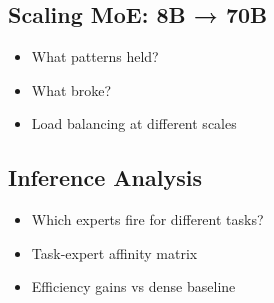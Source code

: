     \subsection{Scaling MoE: 8B → 70B}
        \begin{itemize}
            \item What patterns held?
            \item What broke?
            \item Load balancing at different scales
        \end{itemize}

    \subsection{Inference Analysis}
        \begin{itemize}
            \item Which experts fire for different tasks?
            \item Task-expert affinity matrix
            \item Efficiency gains vs dense baseline
        \end{itemize}
